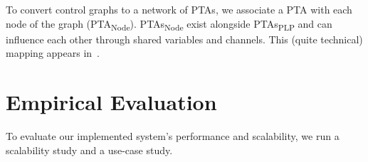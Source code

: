 \documentclass[letterpaper]{article}
\newcommand{\frameImage}[4]{
\begin{figure}[H]
  \centerline{
    \fcolorbox{frameColor}{white}{
        \texttt{[image: \#1]} } }
    \caption{#4}
    \label{fig:#1}
\end{figure}
}
\begin{document}
To convert control graphs to a network of PTAs, we associate a PTA with each node of the graph (PTA\textsubscript{Node}). PTAs\textsubscript{Node} exist alongside PTAs\textsubscript{PLP} and can influence each other through shared variables and channels.
This (quite technical) mapping appears in~\cite{kovalchu2018}.





\section{Empirical Evaluation}
To evaluate our implemented system's performance and scalability,
we run a scalability study and a use-case study.




%


%



\end{document}
